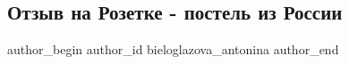  
 
 
 
 
 
\subsection{Отзыв на Розетке - постель из России}
\label{sec:24_11_2021.fb.bieloglazova_antonina.1.otzyv_rozetka_rossia}
 
\ifcmt
 author_begin
   author_id bieloglazova_antonina
 author_end
\fi


